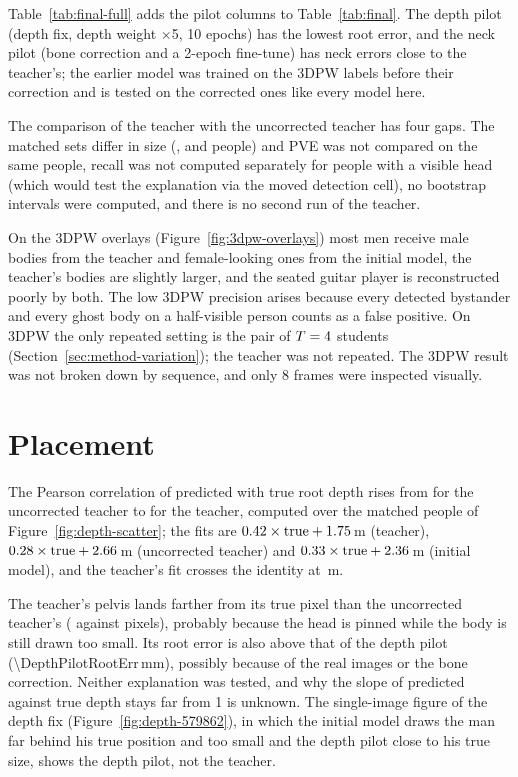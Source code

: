 Table~\ref{tab:final-full} adds the pilot columns to Table~\ref{tab:final}. The depth pilot (depth fix, depth weight
$\times$5, 10 epochs) has the lowest root error, and the neck pilot (bone correction and a 2-epoch fine-tune) has
neck errors close to the teacher's; the earlier model was trained on the 3DPW labels before their correction and is tested on the
corrected ones like every model here.

The comparison of the teacher with the uncorrected teacher has four gaps. The matched sets differ in size
(\FinalMatched, \ControlMatched{} and \BaseMatched{} people) and PVE was not compared on the same people, recall was
not computed separately for people with a visible head (which would test the explanation via the moved detection
cell), no bootstrap intervals were computed, and there is no second run of the teacher.

On the 3DPW overlays (Figure~\ref{fig:3dpw-overlays}) most men receive male bodies from the teacher and
female-looking ones from the initial model, the teacher's bodies are slightly larger, and the seated guitar player is
reconstructed poorly by both. The low 3DPW precision arises because every detected bystander and every ghost body on
a half-visible person counts as a false positive. On 3DPW the only repeated setting is the pair of
$T=4$ students (Section~\ref{sec:method-variation}); the teacher was not repeated. The 3DPW result was not
broken down by sequence, and only 8 frames were inspected visually.

\section{Placement}

The Pearson correlation of predicted with true root depth rises from \ControlDepthR{} for the uncorrected teacher to
\FinalDepthR{} for the teacher, computed over the matched people of Figure~\ref{fig:depth-scatter}; the fits are
$0.42\times\text{true} + 1.75$\,m (teacher), $0.28\times\text{true} + 2.66$\,m
(uncorrected teacher) and $0.33\times\text{true} + 2.36$\,m (initial model), and the teacher's fit
crosses the identity at \FinalIdentityCross\,m.

The teacher's pelvis lands farther from its true pixel than the uncorrected teacher's (\FinalPelvisPx{} against
\ControlPelvisPx{} pixels), probably because the head is pinned while the body is still drawn too small. Its root
error is also above that of the depth pilot (\num{\DepthPilotRootErr}\,mm), possibly because of the real images or
the bone correction. Neither explanation was tested, and why the slope of predicted against true depth stays far from 1
is unknown. The single-image figure of the depth fix (Figure~\ref{fig:depth-579862}), in which the initial model draws the
man far behind his true position and too small and the depth pilot close to his true size, shows the depth pilot,
not the teacher.

